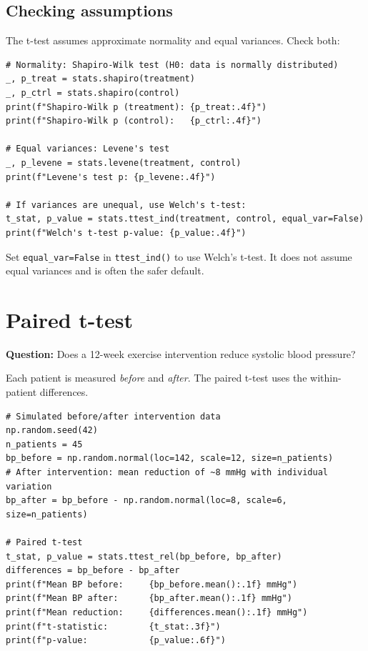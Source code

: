\subsection{Checking assumptions}

The t-test assumes approximate normality and equal variances. Check both:

\begin{verbatim}
# Normality: Shapiro-Wilk test (H0: data is normally distributed)
_, p_treat = stats.shapiro(treatment)
_, p_ctrl = stats.shapiro(control)
print(f"Shapiro-Wilk p (treatment): {p_treat:.4f}")
print(f"Shapiro-Wilk p (control):   {p_ctrl:.4f}")

# Equal variances: Levene's test
_, p_levene = stats.levene(treatment, control)
print(f"Levene's test p: {p_levene:.4f}")

# If variances are unequal, use Welch's t-test:
t_stat, p_value = stats.ttest_ind(treatment, control, equal_var=False)
print(f"Welch's t-test p-value: {p_value:.4f}")
\end{verbatim}

\begin{pythontip}
Set \texttt{equal\_var=False} in \texttt{ttest\_ind()} to use Welch's t-test. It does not assume equal variances and is often the safer default.
\end{pythontip}

\section{Paired t-test}

\textbf{Question:} Does a 12-week exercise intervention reduce systolic blood pressure?

Each patient is measured \emph{before} and \emph{after}. The paired t-test uses the within-patient differences.

\begin{verbatim}
# Simulated before/after intervention data
np.random.seed(42)
n_patients = 45
bp_before = np.random.normal(loc=142, scale=12, size=n_patients)
# After intervention: mean reduction of ~8 mmHg with individual variation
bp_after = bp_before - np.random.normal(loc=8, scale=6, size=n_patients)

# Paired t-test
t_stat, p_value = stats.ttest_rel(bp_before, bp_after)
differences = bp_before - bp_after
print(f"Mean BP before:     {bp_before.mean():.1f} mmHg")
print(f"Mean BP after:      {bp_after.mean():.1f} mmHg")
print(f"Mean reduction:     {differences.mean():.1f} mmHg")
print(f"t-statistic:        {t_stat:.3f}")
print(f"p-value:            {p_value:.6f}")
\end{verbatim}

